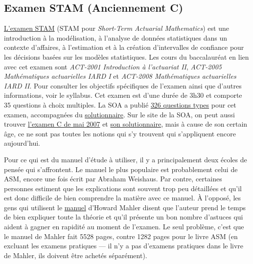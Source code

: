 \subsection*{Examen STAM (Anciennement C)}
\label{subsec:examstam}
\href{https://www.soa.org/Education/Exam-Req/edu-exam-stam-detail.aspx}{L'examen STAM} (STAM pour \textit{Short-Term Actuarial Mathematics}) est une introduction à la modélisation, à l'analyse de données statistiques dans un contexte d'affaires, à l'estimation et à la création d'intervalles de confiance pour les décisions basées sur les modèles statistiques. Les cours du baccalauréat en lien avec cet examen sont \textit{ACT-2001 Introduction à l'actuariat II}, \textit{ACT-2005 Mathématiques actuarielles IARD I} et \textit{ACT-2008 Mathématiques actuarielles IARD II}. Pour consulter les objectifs spécifiques de l'examen ainsi que d'autres informations, voir le syllabus. Cet examen est d'une durée de 3h30 et comporte 35 questions à choix multiples. La SOA a publié \href{https://www.soa.org/Files/Edu/2018/2018-04-exam-stam-questions.pdf}{326 questions types} pour cet examen, accompagnées du \href{https://www.soa.org/Files/Edu/2018/2018-04-exam-stam-solutions.pdf}{solutionnaire}. Sur le site de la SOA, on peut aussi trouver \href{https://www.soa.org/files/edu/edu-mc-exam-c-0507.pdf}{l'examen C de mai 2007} et \href{https://www.soa.org/files/edu/edu-exam-c-0507-sol.pdf}{son solutionnaire}, mais à cause de son certain âge, ce ne sont pas toutes les notions qui s'y trouvent qui s'appliquent encore aujourd'hui. \vspace{\baselineskip}

Pour ce qui est du manuel d'étude à utiliser, il y a principalement deux écoles de pensée qui s'affrontent. Le manuel le plus populaire est probablement celui de ASM, encore une fois écrit par Abraham Weishaus. Par contre, certaines personnes estiment que les explications sont souvent trop peu détaillées et qu'il est donc difficile de bien comprendre la matière avec ce manuel. À l'opposé, les gens qui utilisent le \href{http://howardmahler.com/Teaching/STAM.html}{manuel} d'Howard Mahler disent que l'auteur prend le temps de bien expliquer toute la théorie et qu'il présente un bon nombre d'astuces qui aident à gagner en rapidité au moment de l'examen. Le seul problème, c'est que le manuel de Mahler fait 5528 pages, contre 1282 pages pour le livre ASM (en excluant les examens pratiques --- il n'y a pas d'examens pratiques dans le livre de Mahler, ils doivent être achetés séparément). \vspace{\baselineskip}

